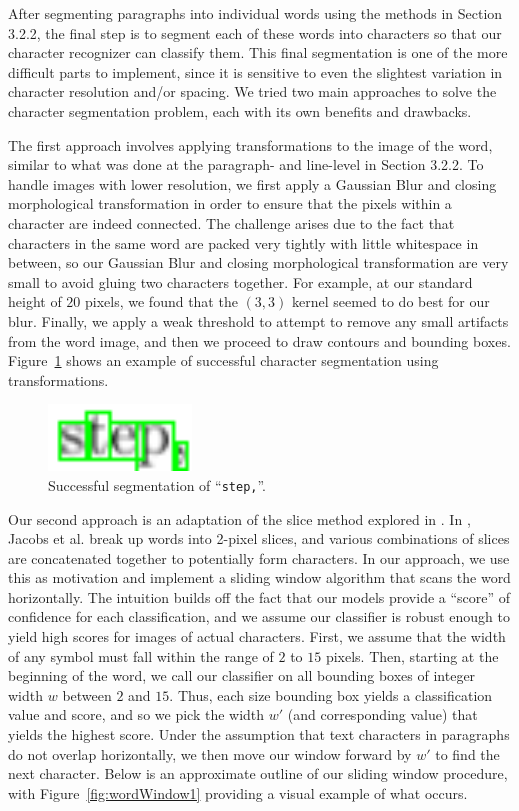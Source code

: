 \documentclass[10pt]{IEEEtran}
\begin{document}
After segmenting paragraphs into individual words using the methods in Section 3.2.2, the final step is to segment each of these words into characters so that our character recognizer can classify them. This final segmentation is one of the more difficult parts to implement, since it is sensitive to even the slightest variation in character resolution and/or spacing. We tried two main approaches to solve the character segmentation problem, each with its own benefits and drawbacks.

The first approach involves applying transformations to the image of the word, similar to what was done at the paragraph- and line-level in Section 3.2.2. To handle images with lower resolution, we first apply a Gaussian Blur and closing morphological transformation in order to ensure that the pixels within a character are indeed connected. The challenge arises due to the fact that characters in the same word are packed very tightly with little whitespace in between, so our Gaussian Blur and closing morphological transformation are very small to avoid gluing two characters together. For example, at our standard height of $20$ pixels, we found that the $(3,3)$ kernel seemed to do best for our blur. Finally, we apply a weak threshold to attempt to remove any small artifacts from the word image, and then we proceed to draw contours and bounding boxes. Figure~\ref{fig:wordBounds1} shows an example of successful character segmentation using transformations.

\begin{figure}[h]
  \centering
    \includegraphics[width=1.5in]{word3-bounds.png}
  \caption{Successful segmentation of ``\texttt{step,}''.}
  \label{fig:wordBounds1}
\end{figure}

Our second approach is an adaptation of the slice method explored in \cite{1}. In \cite{1}, Jacobs et al. break up words into 2-pixel slices, and various combinations of slices are concatenated together to potentially form characters. In our approach, we use this as motivation and implement a sliding window algorithm that scans the word horizontally. The intuition builds off the fact that our models provide a ``score'' of confidence for each classification, and we assume our classifier is robust enough to yield high scores for images of actual characters. First, we assume that the width of any symbol must fall within the range of $2$ to $15$ pixels. Then, starting at the beginning of the word, we call our classifier on all bounding boxes of integer width $w$ between $2$ and $15$. Thus, each size bounding box yields a classification value and score, and so we pick the width $w'$ (and corresponding value) that yields the highest score. Under the assumption that text characters in paragraphs do not overlap horizontally, we then move our window forward by $w'$ to find the next character. Below is an approximate outline of our sliding window procedure, with Figure~\ref{fig:wordWindow1} providing a visual example of what occurs.
\end{document}
